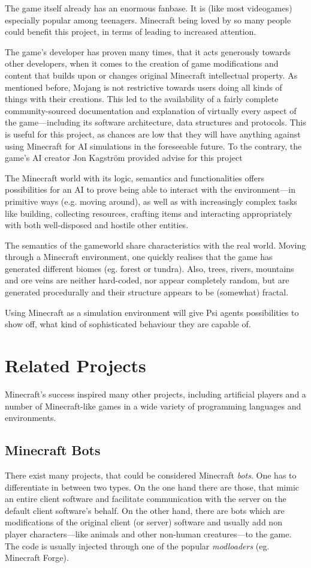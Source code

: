 The game itself already has an enormous fanbase. It is (like most videogames) especially popular among teenagers. Minecraft being loved by so many people could benefit this project, in terms of leading to increased attention.

The game's developer has proven many times, that it acts generously towards  other developers, when it comes to the creation of game modifications and content that builds upon or changes original Minecraft intellectual property. As mentioned before, Mojang is not restrictive towards users doing all kinds of things with their creations. This led to the availability of a fairly complete community-sourced  documentation and explanation of virtually every aspect of the game---including its software architecture, data structures and protocols. This is useful for this project, as chances are low that they will have anything against using Minecraft for AI simulations in the foreseeable future. To the contrary, the game's AI creator Jon Kagström provided advise for this project

The Minecraft world with its logic, semantics and functionalities offers possibilities for an AI to prove being able to interact with the environment---in primitive ways (e.g. moving around), as well as with increasingly complex tasks like building, collecting resources, crafting items and interacting appropriately with both well-disposed and hostile other entities.

The semantics of the gameworld share characteristics with the real world. Moving through a Minecraft environment, one quickly realises that the game has generated different biomes (eg. forest or tundra). Also, trees, rivers, mountains and ore veins are neither hard-coded, nor appear completely random, but are generated procedurally and their structure appears to be (somewhat) fractal.
        
Using Minecraft as a simulation environment will give Psi agents possibilities to show off, what kind of sophisticated behaviour they are capable of.

    \section{Related Projects}
Minecraft's success inspired many other projects, including artificial players and a number of Minecraft-like games in a wide variety of programming languages and environments.


        \subsection{Minecraft Bots}
There exist many projects, that could be considered Minecraft \emph{bots}. One has to differentiate in between two types. On the one hand there are those, that mimic an entire client software and facilitate communication with the server on the default client software's behalf. On the other hand, there are bots which are modifications of the original client (or server) software and usually add non player characters---like animals and other non-human creatures---to the game. The code is usually injected through one of the popular \emph{modloaders} (eg. Minecraft Forge).

